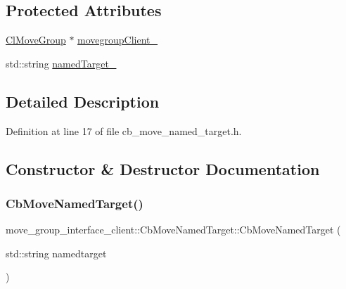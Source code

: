 \subsection*{Protected Attributes}
\begin{DoxyCompactItemize}
\item 
\hyperlink{classmove__group__interface__client_1_1ClMoveGroup}{Cl\+Move\+Group} $\ast$ \hyperlink{classmove__group__interface__client_1_1CbMoveNamedTarget_acd7b16a1c38b103c0624fad1dfd99176}{movegroup\+Client\+\_\+}
\item 
std\+::string \hyperlink{classmove__group__interface__client_1_1CbMoveNamedTarget_a1e985a12ca30e0c6946a28940504f036}{named\+Target\+\_\+}
\end{DoxyCompactItemize}


\subsection{Detailed Description}


Definition at line 17 of file cb\+\_\+move\+\_\+named\+\_\+target.\+h.



\subsection{Constructor \& Destructor Documentation}
\mbox{\label{classmove__group__interface__client_1_1CbMoveNamedTarget_a5046a083fb5fddc968867f50f2e778b6}} 
\subsubsection{\texorpdfstring{Cb\+Move\+Named\+Target()}{CbMoveNamedTarget()}}
{\footnotesize\ttfamily move\+\_\+group\+\_\+interface\+\_\+client\+::\+Cb\+Move\+Named\+Target\+::\+Cb\+Move\+Named\+Target (\begin{DoxyParamCaption}\item[{std\+::string}]{namedtarget }\end{DoxyParamCaption})}



